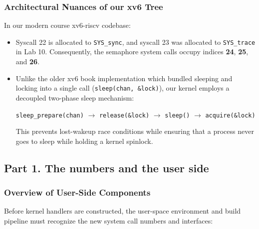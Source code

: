 \documentclass{labreport}
\begin{document}
\subsubsection*{Architectural Nuances of our xv6 Tree}
In our modern course xv6-riscv codebase:
\begin{itemize}[noitemsep]
    \item Syscall 22 is allocated to \texttt{SYS\_sync}, and syscall 23 was allocated to \texttt{SYS\_trace} in Lab 10. Consequently, the semaphore system calls occupy indices \textbf{24}, \textbf{25}, and \textbf{26}.
    \item Unlike the older xv6 book implementation which bundled sleeping and locking into a single call (\texttt{sleep(chan, \&lock)}), our kernel employs a decoupled two-phase sleep mechanism:
    \begin{center}
        \texttt{sleep\_prepare(chan)} $\longrightarrow$ \texttt{release(\&lock)} $\longrightarrow$ \texttt{sleep()} $\longrightarrow$ \texttt{acquire(\&lock)}
    \end{center}
    This prevents lost-wakeup race conditions while ensuring that a process never goes to sleep while holding a kernel spinlock.
\end{itemize}

\subsection{Part 1. The numbers and the user side}

\subsubsection{Overview of User-Side Components}
Before kernel handlers are constructed, the user-space environment and build pipeline must recognize the new system call numbers and interfaces:
\end{document}
